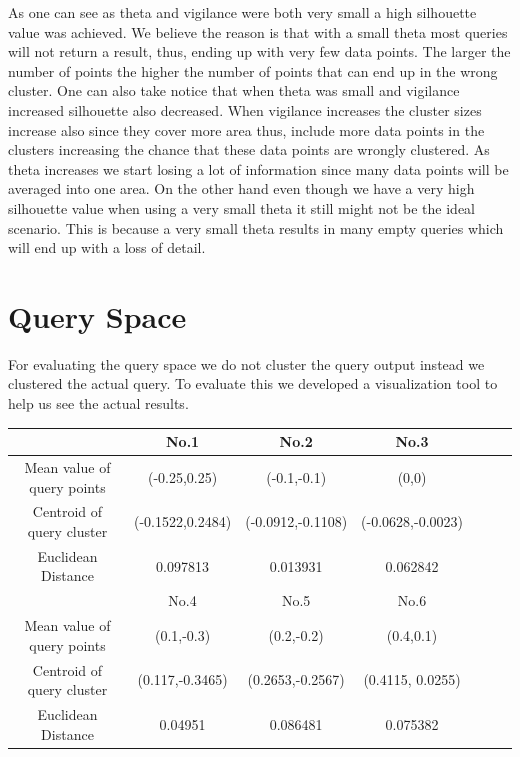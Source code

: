 \documentclass{lmproj}
\begin{document}
As one can see as theta and vigilance were both very small a high silhouette value was achieved. We believe the reason is that with a small theta most queries will not return a result, thus, ending up with very few data points. The larger the number of points the higher the number of points that can end up in the wrong cluster. One can also take notice that when theta was small and vigilance increased silhouette also decreased. When vigilance increases the cluster sizes increase also since they cover more area thus, include more data points in the clusters increasing the chance that these data points are wrongly clustered. As theta increases we start losing a lot of information since many data points will be averaged into one area. On the other hand even though we have a very high silhouette value when using a very small theta it still might not be the ideal scenario. This is because a very small theta results in many empty queries which will end up with a loss of detail.

\section{Query Space}

For evaluating the query space we do not cluster the query output instead we clustered the actual query. To evaluate this we developed a visualization tool to help us see the actual results.

\begin{center}
 \label{table6}
\begin{tabular}{|c|c|c|c|c|c|c|}
	\hline   & No.1 & No.2 & No.3  \\ 
	\hline Mean value of query points & (-0.25,0.25) & (-0.1,-0.1) & (0,0)  \\ 
	\hline Centroid of query cluster & (-0.1522,0.2484) & (-0.0912,-0.1108) & (-0.0628,-0.0023) \\ 
	\hline Euclidean Distance & 0.097813 & 0.013931 & 0.062842 \\
	\hline   & No.4 & No.5 & No.6 \\ 
	\hline Mean value of query points &  (0.1,-0.3) & (0.2,-0.2) & (0.4,0.1) \\ 
	\hline Centroid of query cluster & (0.117,-0.3465) & (0.2653,-0.2567) & (0.4115, 0.0255) \\ 
	\hline Euclidean Distance & 0.04951 & 0.086481 & 0.075382 \\	
	\hline
\end{tabular}
\end{center}
\end{document}
